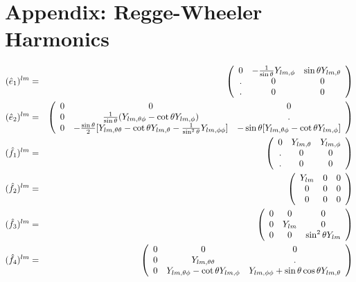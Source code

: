 \documentclass{article}
\begin{document}
\section{Appendix: Regge-Wheeler Harmonics}

\label{reggewheeler}

\begin{eqnarray*}
(\hat{e}_1)^{lm} &=& 
\left( \begin{array}{ccc}
0  & -\frac{1}{\sin\theta}Y_{lm,\phi} & \sin\theta Y_{lm,\theta} \\
.  & 0                                & 0                        \\
.  & 0                                & 0 
\end{array}\right)
\\
(\hat{e}_2)^{lm} &=& 
\left( \begin{array}{ccc} 
0 & 0 & 0 \\
0 & \frac{1}{\sin\theta}(Y_{lm,\theta\phi}-\cot\theta Y_{lm,\phi}) & . \\
0 & -\frac{\sin\theta}{2}[Y_{lm,\theta\theta}-\cot\theta 
    Y_{lm,\theta}-\frac{1}{\sin^2\theta}Y_{lm,\phi\phi}]           & 
            -\sin\theta [Y_{lm,\theta\phi}-\cot\theta Y_{lm,\phi}]
\end{array}\right)
\\
(\hat{f}_1)^{lm} &=& 
\left( \begin{array}{ccc}
  0 & Y_{lm,\theta} & Y_{lm,\phi} \\
  . & 0   & 0           \\
  . & 0   & 0 
\end{array}\right)
\\
(\hat{f}_2)^{lm} &=& 
\left( \begin{array}{ccc}
Y_{lm} & 0 & 0 \\
0      & 0 & 0 \\
0      & 0 & 0 
\end{array}\right)
\\
(\hat{f}_3)^{lm} &=& 
\left( \begin{array}{ccc}
0 & 0  & 0                  \\
0 & Y_{lm} & 0                  \\
0 & 0  & \sin^2\theta Y_{lm} 
\end{array}\right)
\\
(\hat{f}_4)^{lm} &=& 
\left( \begin{array}{ccc}
0 & 0                   & 0 \\
0 & Y_{lm,\theta\theta} & . \\
0 & Y_{lm,\theta\phi}-\cot \theta Y_{lm,\phi} & Y_{lm,\phi\phi}+ \sin\theta \cos\theta Y_{lm,\theta}
\end{array}\right)
\end{eqnarray*}
\end{document}
